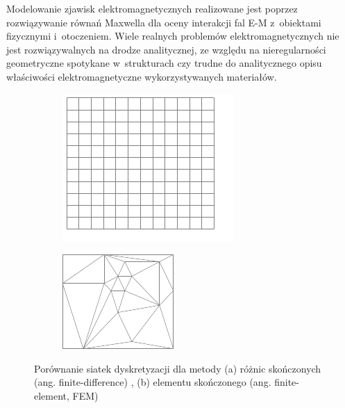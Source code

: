 Modelowanie zjawisk elektromagnetycznych realizowane jest poprzez rozwiązywanie równań Maxwella dla oceny interakcji fal E-M z~obiektami fizycznymi i~otoczeniem. Wiele realnych problemów elektromagnetycznych nie jest rozwiązywalnych na drodze analitycznej, ze względu na nieregularności geometryczne spotykane w~strukturach czy trudne do analitycznego opisu właściwości elektromagnetyczne wykorzystywanych materiałów.


\begin{figure}[tb]
	\centering
	\begin{subfigure}{0.45\textwidth}
		\includegraphics[width=\textwidth]{images/wstep/fdtd.png}
		\caption{}
		\label{fig:wstep-fdtd-dic}
	\end{subfigure}
	\begin{subfigure}{0.45\textwidth}
		\includegraphics[width=\textwidth]{images/wstep/fem.png}
		\caption{}
		\label{fig:wstep-fem-dic}
		
	\end{subfigure}
	\caption{Porównanie siatek dyskretyzacji dla metody (a) różnic skończonych (ang. finite-difference) , (b) elementu skończonego (ang. finite-element, FEM)}
\end{figure}

